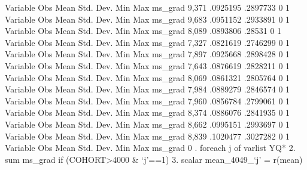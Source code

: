 {\smallskip}
    Variable {\VBAR}        Obs        Mean    Std. Dev.       Min        Max
     ms_grad {\VBAR}      9,371    .0925195    .2897733          0          1
{\smallskip}
    Variable {\VBAR}        Obs        Mean    Std. Dev.       Min        Max
     ms_grad {\VBAR}      9,683    .0951152    .2933891          0          1
{\smallskip}
    Variable {\VBAR}        Obs        Mean    Std. Dev.       Min        Max
     ms_grad {\VBAR}      8,089    .0893806      .28531          0          1
{\smallskip}
    Variable {\VBAR}        Obs        Mean    Std. Dev.       Min        Max
     ms_grad {\VBAR}      7,327    .0821619    .2746299          0          1
{\smallskip}
    Variable {\VBAR}        Obs        Mean    Std. Dev.       Min        Max
     ms_grad {\VBAR}      7,897    .0925668    .2898428          0          1
{\smallskip}
    Variable {\VBAR}        Obs        Mean    Std. Dev.       Min        Max
     ms_grad {\VBAR}      7,643    .0876619    .2828211          0          1
{\smallskip}
    Variable {\VBAR}        Obs        Mean    Std. Dev.       Min        Max
     ms_grad {\VBAR}      8,069    .0861321    .2805764          0          1
{\smallskip}
    Variable {\VBAR}        Obs        Mean    Std. Dev.       Min        Max
     ms_grad {\VBAR}      7,984    .0889279    .2846574          0          1
{\smallskip}
    Variable {\VBAR}        Obs        Mean    Std. Dev.       Min        Max
     ms_grad {\VBAR}      7,960    .0856784    .2799061          0          1
{\smallskip}
    Variable {\VBAR}        Obs        Mean    Std. Dev.       Min        Max
     ms_grad {\VBAR}      8,374    .0886076    .2841935          0          1
{\smallskip}
    Variable {\VBAR}        Obs        Mean    Std. Dev.       Min        Max
     ms_grad {\VBAR}      8,662    .0995151    .2993697          0          1
{\smallskip}
    Variable {\VBAR}        Obs        Mean    Std. Dev.       Min        Max
     ms_grad {\VBAR}      8,839    .1020477    .3027282          0          1
{\smallskip}
    Variable {\VBAR}        Obs        Mean    Std. Dev.       Min        Max
     ms_grad {\VBAR}          0
{\smallskip}
. foreach j of varlist YQ* {\lbr}
  2.                 sum ms_grad if (COHORT>4000 \& `j'==1)
  3.                 scalar mean_4049_`j' = r(mean)
